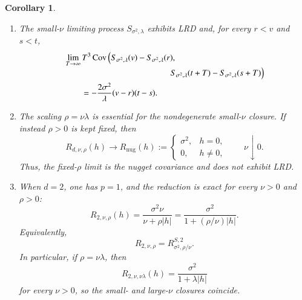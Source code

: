 \documentclass[preprint,12pt,authoryear]{elsarticle}
\newtheorem{cor}{Corollary}
\begin{document}
\begin{cor}
\begin{enumerate}
\item[(iv)]
The small-\(\nu\) limiting process \(S_{\sigma^2,\lambda}\) exhibits
LRD and, for every \(r<v\) and \(s<t\),
\begin{equation}\label{eq:stein-small-nu-lrd}
\begin{aligned}
&\lim_{T\to\infty}T^3
\operatorname{Cov}\left(
S_{\sigma^2,\lambda}(v)
-
S_{\sigma^2,\lambda}(r),
\right.\\[-1mm]
&\hspace{4.3cm}\left.
S_{\sigma^2,\lambda}(t+T)
-
S_{\sigma^2,\lambda}(s+T)
\right)\\
&\qquad
=
-\frac{2\sigma^2}{\lambda}(v-r)(t-s).
\end{aligned}
\end{equation}

\item[(v)]
The scaling \(\rho=\nu\lambda\) is essential for the nondegenerate
small-\(\nu\) closure. If instead \(\rho>0\) is kept fixed, then
\begin{equation}\label{eq:stein-fixed-rho-small-nu}
R_{d,\nu,\rho}(h)
\longrightarrow
R_{\mathrm{nug}}(h)
:=
\begin{cases}
\sigma^2, & h=0,\\
0, & h\neq0,
\end{cases}
\qquad \nu\downarrow0.
\end{equation}
Thus, the fixed-\(\rho\) limit is the nugget covariance and does not
exhibit LRD.

\item[(vi)]
When \(d=2\), one has \(p=1\), and the reduction is exact for every
\(\nu>0\) and \(\rho>0\):
\begin{equation}\label{eq:stein-d2-exact}
R_{2,\nu,\rho}(h)
=
\frac{\sigma^2\nu}{\nu+\rho|h|}
=
\frac{\sigma^2}{1+(\rho/\nu)|h|}.
\end{equation}
Equivalently,
\[
R_{2,\nu,\rho}
=
R^{S,2}_{\sigma^2,\rho/\nu}.
\]
In particular, if \(\rho=\nu\lambda\), then
\[
R_{2,\nu,\nu\lambda}(h)
=
\frac{\sigma^2}{1+\lambda|h|}
\]
for every \(\nu>0\), so the small- and large-\(\nu\) closures coincide.


\end{enumerate}
\end{cor}
\end{document}
